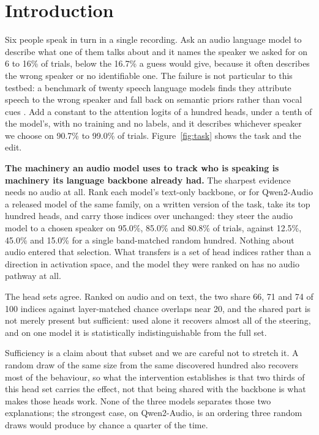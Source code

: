 \documentclass[11pt]{article}
\begin{document}
\section{Introduction}
\label{sec:intro}

Six people speak in turn in a single recording. Ask an audio language model to
describe what one of them talks about and it names the speaker we asked for on 6
to 16\% of trials, below the 16.7\% a guess would give, because it often
describes the wrong speaker or no identifiable one. The failure is not particular to this
testbed: a benchmark of twenty speech language models finds they attribute speech
to the wrong speaker and fall back on semantic priors rather than vocal cues
\citep{hear2026}. Add a constant to the attention logits
of a hundred heads, under a tenth of the model's, with no training and no labels,
and it describes whichever speaker we choose on 90.7\% to 99.0\% of trials.
Figure~\ref{fig:task} shows the task and the edit.

\textbf{The machinery an audio model uses to track who is speaking is machinery
its language backbone already had.} The sharpest evidence needs no audio at all.
Rank each model's text-only backbone, or for Qwen2-Audio a released model of the
same family, on a written version of the task, take
its top hundred heads, and carry those indices over unchanged: they steer the
audio model to a chosen speaker on 95.0\%, 85.0\% and 80.8\% of trials, against
12.5\%, 45.0\% and 15.0\% for a single band-matched random hundred. Nothing about audio entered that selection. What transfers is a set of
head indices rather than a direction in activation space, and the model they were
ranked on has no audio pathway at all.

The head sets agree. Ranked on audio and on text, the two share 66, 71 and 74 of
100 indices against layer-matched chance overlaps near 20, and the shared part is
not merely present but sufficient: used alone it recovers almost all of the
steering, and on one model it is statistically indistinguishable from the full
set.

Sufficiency is a claim about that subset and we are careful not to stretch it. A
random draw of the same size from the same discovered hundred also recovers most
of the behaviour, so what the intervention establishes is that two thirds of this
head set carries the effect, not that being shared with the backbone is what
makes those heads work. None of the three models separates those two
explanations; the strongest case, on Qwen2-Audio, is an ordering three random
draws would produce by chance a quarter of the time.
\end{document}
